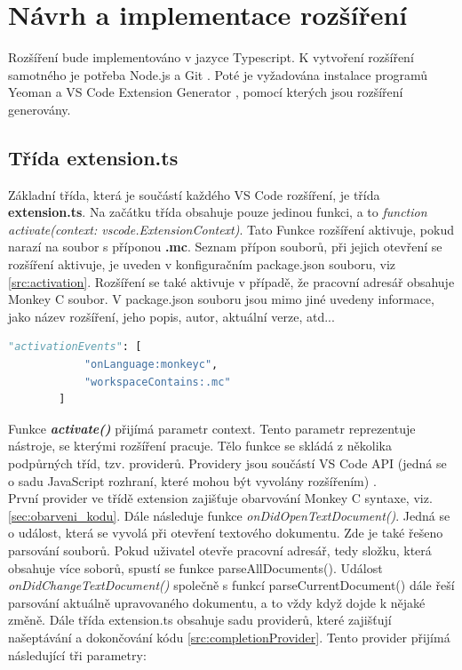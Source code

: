 \chapter{Návrh a implementace rozšíření}
Rozšíření bude implementováno v jazyce Typescript. K vytvoření rozšíření samotného je potřeba Node.js \cite{nodejs} a Git \cite{git}. Poté je vyžadována instalace programů Yeoman \cite{yeoman} a VS Code Extension Generator \cite{YO_Generator}, pomocí kterých jsou rozšíření generovány.\\

\section{Třída extension.ts}
Základní třída, která je součástí každého VS Code rozšíření, je třída \textbf{extension.ts}. Na začátku třída obsahuje pouze jedinou funkci, a to \textit{function activate(context: vscode.ExtensionContext)}. Tato Funkce rozšíření aktivuje, pokud narazí na soubor s příponou \textbf{.mc}. Seznam přípon souborů, při jejich otevření se rozšíření aktivuje, je uveden v konfiguračním package.json souboru, viz \ref{src:activation}. Rozšíření se také aktivuje v případě, že pracovní adresář obsahuje Monkey C soubor. V package.json souboru jsou mimo jiné uvedeny informace, jako název rozšíření, jeho popis, autor, aktuální verze, atd...\\

\begin{lstlisting}[language=Python,label=src:activation,caption={aktivační události rozšíření}]
        "activationEvents": [
			"onLanguage:monkeyc",
			"workspaceContains:.mc"
		]
\end{lstlisting}

Funkce \textit{\textbf{activate()}} přijímá parametr context. Tento parametr reprezentuje nástroje, se kterými rozšíření pracuje. Tělo funkce se skládá z několika podpůrných tříd, tzv. providerů. Providery jsou součástí VS Code API (jedná se o sadu JavaScript rozhraní, které mohou být vyvolány rozšířením) \cite{vscodeAPI}. \\
První provider ve třídě extension zajišťuje obarvování Monkey C syntaxe, viz. \ref{sec:obarveni_kodu}. Dále následuje funkce \textit{onDidOpenTextDocument()}. Jedná se o událost, která se vyvolá při otevření textového dokumentu. Zde je také řešeno parsování souborů. Pokud uživatel otevře pracovní adresář, tedy složku, která obsahuje více soborů, spustí se funkce parseAllDocuments(). Událost \textit{onDidChangeTextDocument()} společně s funkcí parseCurrentDocument() dále řeší parsování aktuálně upravovaného dokumentu, a to vždy když dojde k nějaké změně. Dále třída extension.ts obsahuje sadu providerů, které zajišťují našeptávání a dokončování kódu \ref{src:completionProvider}. Tento provider přijímá následující tři parametry: 

